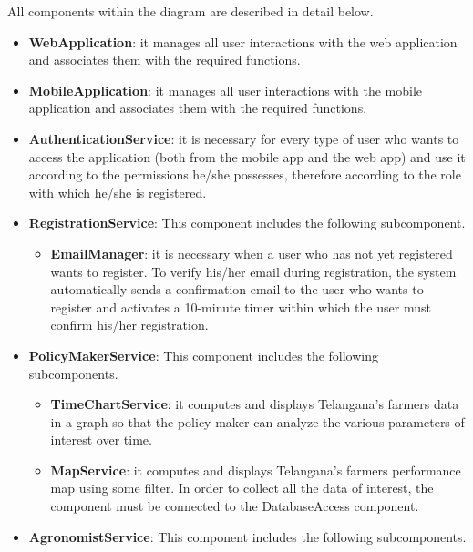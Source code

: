 All components within the diagram are described in detail below.
\begin{itemize}

\item \textbf{WebApplication}: it manages all user interactions with the web application and associates them with the required functions.

\item \textbf{MobileApplication}: it manages all user interactions with the mobile application and associates them with the required functions.

\item \textbf{AuthenticationService}: it is necessary for every type of user who wants to access the application (both from the mobile app and the web app) and use it according to the permissions he/she possesses, therefore according to the role with which he/she is registered.

\item \textbf{RegistrationService}: This component includes the following subcomponent.

\begin{itemize}

\item \textbf{EmailManager}: it is necessary when a user who has not yet registered wants to register. To verify his/her email during registration, the system automatically sends a confirmation email to the user who wants to register and activates a 10-minute timer within which the user must confirm his/her registration.
\end{itemize}
\item \textbf{PolicyMakerService}: This component includes the following subcomponents.

\begin{itemize}
    \item \textbf{TimeChartService}: it computes and displays Telangana’s farmers data in a graph so that the policy maker can analyze the various parameters of interest over time.
    \item \textbf{MapService}: it computes and displays Telangana’s farmers performance map using some filter. In order to collect all the data of interest, the component must be connected to the DatabaseAccess component. 
\end{itemize}

\item \textbf{AgronomistService}: This component includes the following subcomponents.


\end{itemize}
